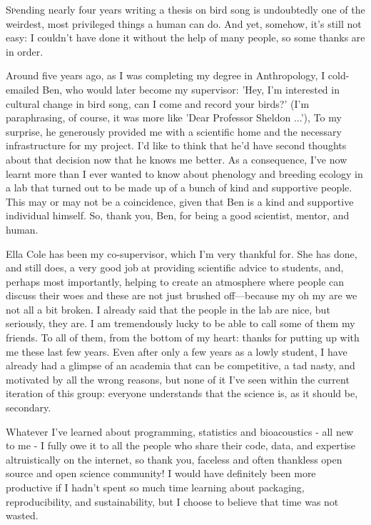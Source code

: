 \lettrine[lines=2]Spending nearly four years writing a thesis on bird song is undoubtedly one of the weirdest, most privileged things a human can do. And yet, somehow, it's still not easy: I couldn't have done it without the help of many people, so some thanks are in order.

Around five years ago, as I was completing my degree in Anthropology, I cold-emailed Ben, who would later become my supervisor: 'Hey, I'm interested in cultural change in bird song, can I come and record your birds?' (I'm paraphrasing, of course, it was more like 'Dear Professor Sheldon ...'), To my surprise, he generously provided me with a scientific home and the necessary infrastructure for my project. I'd like to think that he'd have second thoughts about that decision now that he knows me better. As a consequence, I've now learnt more than I ever wanted to know about phenology and breeding ecology in a lab that turned out to be made up of a bunch of kind and supportive people. This may or may not be a coincidence, given that Ben is a kind and supportive individual himself. So, thank you, Ben, for being a good scientist, mentor, and human. 

Ella Cole has been my co-supervisor, which I'm very thankful for. She has done, and still does, a very good job at providing scientific advice to students, and, perhaps most importantly, helping to create an atmosphere where people can discuss their woes and these are not just brushed off---because my oh my are we not all a bit broken. I already said that the people in the lab are nice, but seriously, they are. I am tremendously lucky to be able to call some of them my friends. To all of them, from the bottom of my heart: thanks for putting up with me these last few years. Even after only a few years as a lowly student, I have already had a glimpse of an academia that can be competitive, a tad nasty, and motivated by all the wrong reasons, but none of it I've seen within the current iteration of this group: everyone understands that the science is, as it should be, secondary.

Whatever I've learned about programming, statistics and bioacoustics - all new to me - I fully owe it to all the people who share their code, data, and expertise altruistically on the internet, so thank you, faceless and often thankless open source and open science community! I would have definitely been more productive if I hadn't spent so much time learning about packaging, reproducibility, and sustainability, but I choose to believe that time was not wasted.


